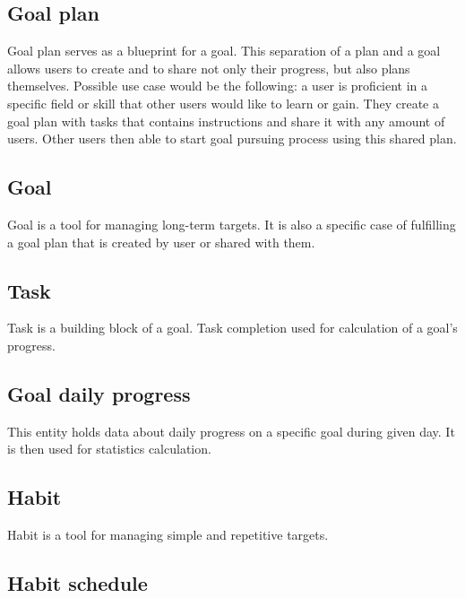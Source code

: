 \subsection{Goal plan}\label{subsec:goal-plan}

Goal plan serves as a blueprint for a goal.
This separation of a plan and a goal allows users to create and to share not only their progress, but also plans themselves.
Possible use case would be the following: a user is proficient in a specific field or skill that other users would like to learn or gain.
They create a goal plan with tasks that contains instructions and share it with any amount of users.
Other users then able to start goal pursuing process using this shared plan.

\subsection{Goal}\label{subsec:goal}

Goal is a tool for managing long-term targets.
It is also a specific case of fulfilling a goal plan that is created by user or shared with them.

\subsection{Task}\label{subsec:task}

Task is a building block of a goal.
Task completion used for calculation of a goal's progress.

\subsection{Goal daily progress}\label{subsec:goal-daily-progess}

This entity holds data about daily progress on a specific goal during given day.
It is then used for statistics calculation.

\subsection{Habit}\label{subsec:habit}

Habit is a tool for managing simple and repetitive targets.

\subsection{Habit schedule}\label{subsec:habit-schedule}

